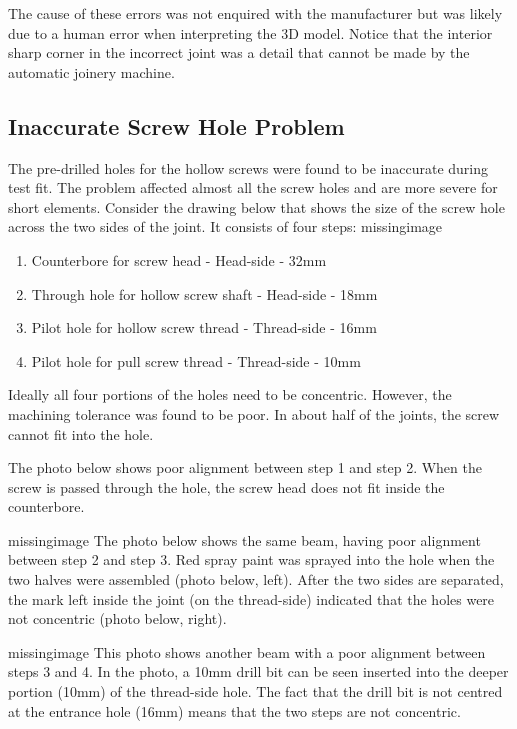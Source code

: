 The cause of these errors was not enquired with the manufacturer but was likely due to a human error when interpreting the 3D model. Notice that the interior sharp corner in the incorrect joint was a detail that cannot be made by the automatic joinery machine. 

\subsection{Inaccurate Screw Hole Problem}
The pre-drilled holes for the hollow screws were found to be inaccurate during test fit. The problem affected almost all the screw holes and are more severe for short elements.
Consider the drawing below that shows the size of the screw hole across the two sides of the joint. It consists of four steps:
missingimage

\begin{enumerate}
    \item Counterbore for screw head - Head-side - 32mm
    \item Through hole for hollow screw shaft - Head-side - 18mm
    \item Pilot hole for hollow screw thread - Thread-side - 16mm
    \item Pilot hole for pull screw thread - Thread-side - 10mm

\end{enumerate}

Ideally all four portions of the holes need to be concentric. However, the machining tolerance was found to be poor. In about half of the joints, the screw cannot fit into the hole.

The photo below shows poor alignment between step 1 and step 2. When the screw is passed through the hole, the screw head does not fit inside the counterbore.

missingimage
The photo below shows the same beam, having poor alignment between step 2 and step 3. Red spray paint was sprayed into the hole when the two halves were assembled (photo below, left). After the two sides are separated, the mark left inside the joint (on the thread-side) indicated that the holes were not concentric (photo below, right).

missingimage
This photo shows another beam with a poor alignment between steps 3 and 4. In the photo, a 10mm drill bit can be seen inserted into the deeper portion (10mm) of the thread-side hole. The fact that the drill bit is not centred at the entrance hole (16mm) means that the two steps are not concentric.

